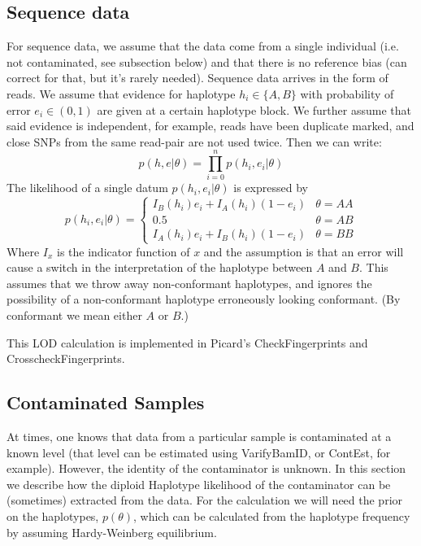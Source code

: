 \documentclass[12pt]{article}
\begin{document}
\subsection{Sequence data}
For sequence data, we assume that the data come from a single individual (i.e. not contaminated, see subsection below) and that there is no reference bias (can correct for that, but it's rarely needed).
Sequence data arrives in the form of reads. 
We assume that evidence for haplotype $h_i\in\{A,B\}$ with probability of error $e_i\in(0,1)$ are given at a certain haplotype block.
We further assume that said evidence is independent, for example, reads have been duplicate marked, and close SNPs from the same read-pair are not used twice.
Then we can write:
\begin{equation}
p(h,e|\theta)=\prod_{i=0}^n p(h_i,e_i|\theta)
\end{equation}
The likelihood of a single datum $p(h_i,e_i|\theta)$ is expressed by
\begin{equation}
p(h_i,e_i|\theta)=\begin{cases}
I_B(h_i)e_i + I_A(h_i)(1-e_i) & \theta=AA\\
0.5 & \theta=AB\\
I_A(h_i)e_i + I_B(h_i)(1-e_i) &  \theta=BB
\end{cases}
\end{equation}
Where $I_x$ is the indicator function of $x$ and the assumption is that an error will cause a switch in the interpretation of the haplotype between $A$ and $B$.
This assumes that we throw away non-conformant haplotypes, and ignores the possibility of a non-conformant haplotype erroneously looking conformant. 
(By conformant we mean either $A$ or $B$.)

This LOD calculation is implemented in Picard's CheckFingerprints and CrosscheckFingerprints.

\subsection{Contaminated Samples}
At times, one knows that data from a particular sample is contaminated at a known level (that level can be estimated using VarifyBamID, or ContEst, for example). 
However, the identity of the contaminator is unknown. 
In this section we describe how the diploid Haplotype likelihood of the contaminator can be (sometimes) extracted from the data.
For the calculation we will need the prior on the haplotypes, $p(\theta)$, which can be calculated from the haplotype frequency by assuming Hardy-Weinberg equilibrium.
\end{document}
